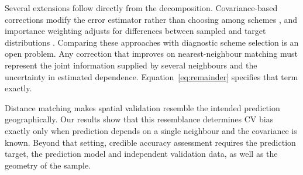 Several extensions follow directly from the decomposition. Covariance-based corrections modify the error estimator rather than choosing among schemes \citep{rabinowicz2022correlated}, and importance weighting adjusts for differences between sampled and target distributions \citep{sugiyama2007covariate,debruin2022clustered,brenning2026targetweighted}. Comparing these approaches with diagnostic scheme selection is an open problem. Any correction that improves on nearest-neighbour matching must represent the joint information supplied by several neighbours and the uncertainty in estimated dependence. Equation~\eqref{eq:remainder} specifies that term exactly.

Distance matching makes spatial validation resemble the intended prediction geographically. Our results show that this resemblance determines CV bias exactly only when prediction depends on a single neighbour and the covariance is known. Beyond that setting, credible accuracy assessment requires the prediction target, the prediction model and independent validation data, as well as the geometry of the sample.
